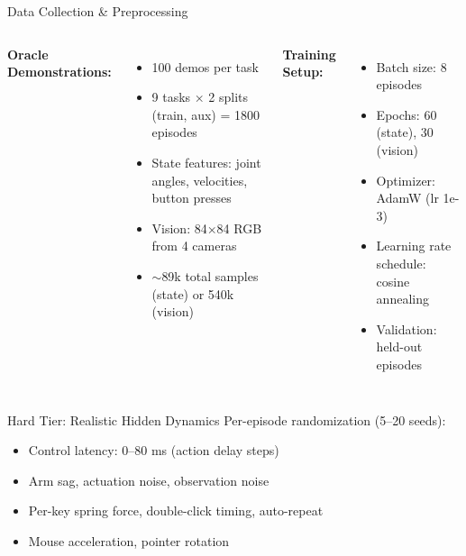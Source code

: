 \documentclass[10pt,aspectratio=16:9]{beamer}
\begin{document}
\begin{frame}{Data Collection \& Preprocessing}
  \begin{columns}
    \textbf{Oracle Demonstrations:}
    \begin{itemize}
      \item 100 demos per task
      \item 9 tasks × 2 splits (train, aux) = 1800 episodes
      \item State features: joint angles, velocities, button presses
      \item Vision: 84×84 RGB from 4 cameras
      \item $\sim$89k total samples (state) or 540k (vision)
    \end{itemize}

    \textbf{Training Setup:}
    \begin{itemize}
      \item Batch size: 8 episodes
      \item Epochs: 60 (state), 30 (vision)
      \item Optimizer: AdamW (lr 1e-3)
      \item Learning rate schedule: cosine annealing
      \item Validation: held-out episodes
    \end{itemize}
  \end{columns}

  \vspace{1em}

  \begin{block}{Hard Tier: Realistic Hidden Dynamics}
    \vspace{0.2em}
    Per-episode randomization (5–20 seeds):
    \begin{itemize}
      \item Control latency: 0–80 ms (action delay steps)
      \item Arm sag, actuation noise, observation noise
      \item Per-key spring force, double-click timing, auto-repeat
      \item Mouse acceleration, pointer rotation
    \end{itemize}
    \vspace{0.2em}
  \end{block}
\end{frame}

\end{document}
